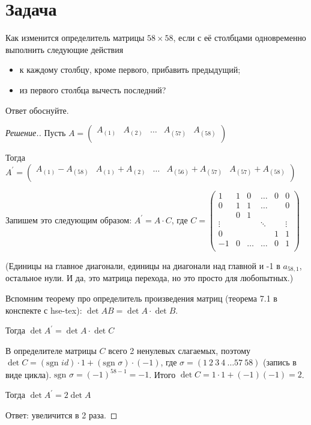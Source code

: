 \documentclass[a4paper]{article}
\theoremstyle{remark}
\begin{document}
    \section*{Задача }
        Как изменится определитель матрицы $58 \times 58$, если с её столбцами одновременно 
        выполнить следующие действия 
        \begin{itemize}
            \item к каждому столбцу, кроме первого, прибавить предыдущий;
            \item из первого столбца вычесть последний?
        \end{itemize}
        Ответ обоснуйте.
	    \begin{proof}[Решение.]
            Пусть $A = 
            \begin{pmatrix}
                A_{(1)} & A_{(2)} & \ldots & A_{(57)} & A_{(58)} \\ 
            \end{pmatrix}$

            Тогда $A^{\prime} = 
            \begin{pmatrix}
                A_{(1)} - A_{(58)} & A_{(1)} + A_{(2)} & \ldots & A_{(56)} + A_{(57)} & A_{(57)} + A_{(58)} \\ 
            \end{pmatrix}$

            Запишем это следующим образом: 
            $A^{\prime} = A \cdot C$, где $C = 
            \begin{pmatrix}
                1 & 1 & 0 & \ldots & 0 & 0 \\ 
                0 & 1 & 1 & \ldots &   & 0 \\ 
                  & 0 & 1 &   &   &   \\ 
                \vdots &   &   & \ddots &   &  \vdots \\ 
                0 &  &  &   &   1 &   1\\ 
                -1 & 0 &  \ldots& \ldots &   0 &   1\\ 
            \end{pmatrix}
            $

            (Единицы на главное диагонали, единицы на диагонали над главной и -1 
            в $a_{58, 1}$, остальное нули. И да, это матрица перехода, но это просто для любопытных.)

            Вспомним теорему про определитель произведения матриц (теорема 7.1 в конспекте с hse-tex): 
            $\det AB = \det A \cdot \det B$.

            Тогда $\det A^{\prime} = \det A \cdot \det C$

            В определителе матрицы $C$ всего 2 ненулевых слагаемых, поэтому $\det C = (\text{sgn } id) \cdot 1 + (\text{sgn } \sigma) \cdot (-1)$, где 
            $\sigma = (1\ 2\ 3\ 4\ \ldots 57\ 58)$ (запись в виде цикла). $\text{sgn } \sigma = (-1)^{58 - 1} = -1$. Итого $\det C = 1 \cdot 1 + (-1)(-1) = 2$. 

            Тогда $\det A^{\prime} = 2\det A $

            Ответ: увеличится в 2 раза.
        \end{proof}
 	
\end{document}
